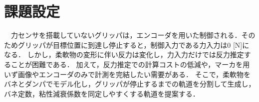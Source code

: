\documentclass[a4paper]{jarticle}
\begin{document}
\section{課題設定}
　力センサを搭載していないグリッパは，エンコーダを用いた制御される．そのためグリッパが目標位置に到達し停止すると，制御入力である力入力は0 [N]になる．
しかし，柔軟物の変形に伴い反力は変化し，力入力だけでは反力推定することが困難である．
加えて，反力推定での計算コストの低減や，マーカを用いず画像やエンコーダのみで計測を完結したい需要がある．
そこで，柔軟物をバネとダンパでモデル化し，グリッパが停止するまでの軌道を分割して生成し，バネ定数，粘性減衰係数を同定しやすくする軌道を提案する．

\end{document}

